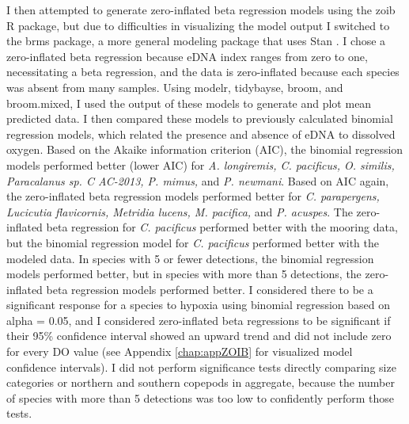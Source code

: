 \documentclass[12pt,twoside]{reedthesis}
\begin{document}
	I then attempted to generate zero-inflated beta regression models using the zoib R package, but due to difficulties in visualizing the model output I switched to the brms package, a more general modeling package that uses Stan \autocite{Burkner2024}. I chose a zero-inflated beta regression because eDNA index ranges from zero to one, necessitating a beta regression, and the data is zero-inflated because each species was absent from many samples. Using modelr, tidybayse, broom, and broom.mixed, I used the output of these models to generate and plot mean predicted data. I then compared these models to previously calculated binomial regression models, which related the presence and absence of eDNA to dissolved oxygen. Based on the Akaike information criterion (AIC), the binomial regression models performed better (lower AIC) for \textit{A. longiremis, C. pacificus, O. similis, Paracalanus sp. C AC-2013, P. mimus,} and \textit{P. newmani}. Based on AIC again, the zero-inflated beta regression models performed better for \textit{C. parapergens, Lucicutia flavicornis, Metridia lucens, M. pacifica,} and \textit{P. acuspes}. The zero-inflated beta regression for \textit{C. pacificus} performed better with the mooring data, but the binomial regression model for \textit{C. pacificus} performed better with the modeled data. In species with 5 or fewer detections, the binomial regression models performed better, but in species with more than 5 detections, the zero-inflated beta regression models performed better. I considered there to be a significant response for a species to hypoxia using binomial regression based on alpha = 0.05, and I considered zero-inflated beta regressions to be significant if their 95\% confidence interval showed an upward trend and did not include zero for every DO value (see Appendix \ref{chap:appZOIB} for visualized model confidence intervals). I did not perform significance tests directly comparing size categories or northern and southern copepods in aggregate, because the number of species with more than 5 detections was too low to confidently perform those tests. 

\end{document}
